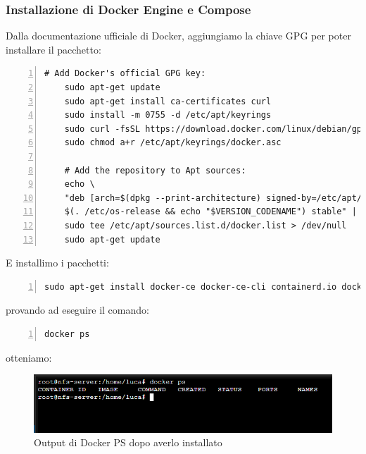 \documentclass[a4paper]{article}
\begin{document}
\subsubsection{Installazione di Docker Engine e Compose}
Dalla documentazione ufficiale di Docker, aggiungiamo la chiave \Gls{GPG}
per poter installare il pacchetto:
\begin{Verbatim}[numbers=left,breaklines]
    # Add Docker's official GPG key:
    sudo apt-get update
    sudo apt-get install ca-certificates curl
    sudo install -m 0755 -d /etc/apt/keyrings
    sudo curl -fsSL https://download.docker.com/linux/debian/gpg -o /etc/apt/keyrings/docker.asc
    sudo chmod a+r /etc/apt/keyrings/docker.asc

    # Add the repository to Apt sources:
    echo \
    "deb [arch=$(dpkg --print-architecture) signed-by=/etc/apt/keyrings/docker.asc] https://download.docker.com/linux/debian \
    $(. /etc/os-release && echo "$VERSION_CODENAME") stable" | \
    sudo tee /etc/apt/sources.list.d/docker.list > /dev/null
    sudo apt-get update
\end{Verbatim}
E installimo i pacchetti:
\begin{Verbatim}[numbers=left,breaklines]
    sudo apt-get install docker-ce docker-ce-cli containerd.io docker-buildx-plugin docker-compose-plugin
\end{Verbatim}
provando ad eseguire il comando:
\begin{Verbatim}[numbers=left]
    docker ps
\end{Verbatim}
otteniamo:
\begin{figure}[H]
    \centering
    \includegraphics[scale=0.65]{images/DockerInstallato.png}
    \caption{Output di Docker PS dopo averlo installato}
\end{figure}
\printbibliography
\printglossaries
\end{document}
